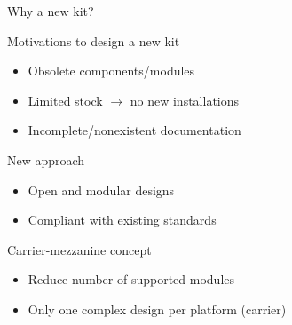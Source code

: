 \documentclass[compress,red]{beamer}
\begin{document}
\begin{frame}{Why a new kit?}

  \begin{block}{Motivations to design a new kit}
    \begin{itemize}
    \item Obsolete components/modules
    \item Limited stock $\rightarrow$ no new installations
    \item Incomplete/nonexistent documentation
    \end{itemize}
  \end{block}

  \begin{block}{New approach}
    \begin{itemize}
    \item Open and modular designs
    \item Compliant with existing standards
    \end{itemize}
  \end{block}

  \begin{block}{Carrier-mezzanine concept}
    \begin{itemize}
    \item Reduce number of supported modules
    \item Only one complex design per platform (carrier)
    \end{itemize}
  \end{block}


\end{frame}
\end{document}
